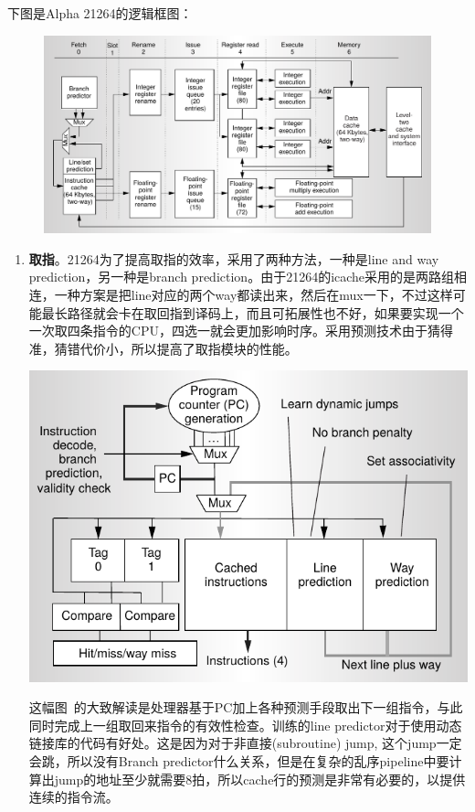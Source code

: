 \documentclass{article}
\begin{document}
		下图是Alpha 21264的逻辑框图：~\cite{alpha}
		\begin{figure}[H]
			\centering
			\includegraphics[width=0.8\linewidth]{figs/21264.png}
		\end{figure}
	\begin{multicols}{2}
	\begin{enumerate}
		\item \textbf{取指}。21264为了提高取指的效率，采用了两种方法，一种是line and way prediction，另一种是branch prediction。由于21264的icache采用的是两路组相连，一种方案是把line对应的两个way都读出来，然后在mux一下，不过这样可能最长路径就会卡在取回指到译码上，而且可拓展性也不好，如果要实现一个一次取四条指令的CPU，四选一就会更加影响时序。采用预测技术由于猜得准，猜错代价小，所以提高了取指模块的性能。
		
		\includegraphics[width=\linewidth]{figs/prediction.png}
		
		这幅图~\cite{alpha}的大致解读是处理器基于PC加上各种预测手段取出下一组指令，与此同时完成上一组取回来指令的有效性检查。训练的line predictor对于使用动态链接库的代码有好处。这是因为对于非直接(subroutine) jump, 这个jump一定会跳，所以没有Branch predictor什么关系，但是在复杂的乱序pipeline中要计算出jump的地址至少就需要8拍，所以cache行的预测是非常有必要的，以提供连续的指令流。
		

\end{enumerate}
\end{multicols}
\end{document}
